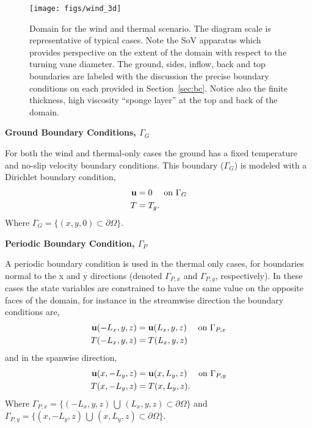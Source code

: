 \begin{figure}[!htb]
  \begin{center}
   \texttt{[image: figs/wind\_3d]}
    \caption{Domain for the wind and thermal scenario. The diagram scale
   is representative of typical cases. Note the SoV apparatus which
   provides perspective on the extent of the domain with respect to the
   turning vane diameter. The ground, sides, inflow, back and top
   boundaries are labeled with the discussion the precise boundary
   conditions on each provided in Section~\ref{sec:bc}. Notice also the
   finite thickness, high viscosity ``sponge layer'' at the top and back
   of the domain.}   
    \label{fig:wind3d}
  \end{center}
\end{figure}

\textbf{Ground Boundary Conditions, $\Gamma_G$} 

For both the wind and thermal-only cases the ground has a fixed
temperature and no-slip velocity boundary conditions. This boundary 
($\Gamma_G$) is modeled with a Dirichlet boundary condition, 
\begin{align}
 {\bf u} &= 0 \quad \text{ on } \Gamma_G \\
 T &= T_g.
\end{align}
Where $\Gamma_G = \{(x,y,0) \subset \partial \Omega \} $. 

%
%
%
\textbf{Periodic Boundary Condition, $\Gamma_P$} 

A periodic boundary condition is used in the thermal only cases, 
for boundaries normal to the x and y directions 
(denoted $\Gamma_{P,x}$ and $\Gamma_{P,y}$, respectively). In these
cases the state variables  
are constrained to have the same value on the opposite faces of the domain, 
for instance in the streamwise direction the boundary conditions are, 
\begin{align}
 {\bf u}(-L_x,y,z) &= {\bf u}(L_x,y,z) \quad \text{ on } \Gamma_{P,x} \\
 T(-L_x,y,z) &= T(L_x,y,z)
\end{align}
and in the spanwise direction,
\begin{align}
 {\bf u}(x,-L_y,z) &= {\bf u}(x,L_y,z) \quad \text{ on } \Gamma_{P,y} \\
 T(x,-L_y,z) &= T(x,L_y,z). 
\end{align}
Where $\Gamma_{P,x} = \{(-L_x,y,z) \, \bigcup \, (L_x,y,z) \subset \partial
\Omega \}$  
and $\Gamma_{P,y} = \{(x,-L_y,z) \, \bigcup \, (x,L_y,z) \subset \partial
\Omega \}$. 

